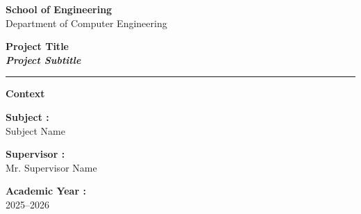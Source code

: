 \begin{titlepage}

    \noindent
    \begin{minipage}{0.48\textwidth}
    \end{minipage}
    \hfill
    \begin{minipage}{0.48\textwidth}
        \raggedleft
        {\Large \textbf{School of Engineering}}\\[0.2cm]
        {\large Department of Computer Engineering}
    \end{minipage}
    
    \vspace{2cm}
    
    \begin{center}
        {\huge \textbf{Project Title}}\\[0.4cm]
        {\large \textit{\textbf{Project Subtitle}}}\\[1cm]
        
        \rule{\textwidth}{1pt}
    \end{center}
    
    \vspace{0.5cm}
    
    \begin{center}
        \large
        \textbf{Context} \\
    \end{center}
    
    \vspace{2cm}
    
    \begin{minipage}{0.45\textwidth}
    \large
    \textbf{Subject :}\\
    Subject Name
    
    \vspace{1cm}
    
    \textbf{Supervisor :}\\
    Mr. Supervisor Name
    
    \end{minipage}
    \hfill
    \begin{minipage}{0.45\textwidth}
    \large
    \textbf{Academic Year :}\\
    2025--2026
    

\end{minipage}
\end{titlepage}
